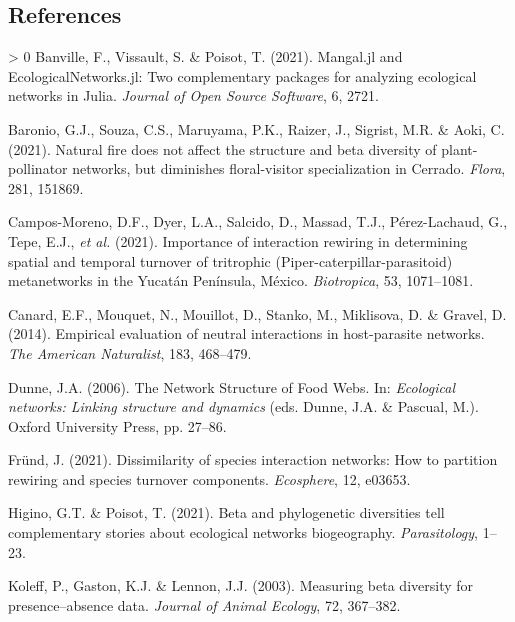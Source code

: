 \documentclass[11pt]{article}
\newlength{\cslhangindent}
\newenvironment{CSLReferences}[3] %
 {%
  \setlength{\parindent}{0pt}
  \ifodd #1 \everypar{\setlength{\hangindent}{\cslhangindent}}\ignorespaces\fi
  \ifnum #2 > 0
  \setlength{\parskip}{#2\baselineskip}
  \fi
 }%
 {}
\begin{document}
\hypertarget{references}{%
\subsection*{References}\label{references}}

\hypertarget{refs}{}
\begin{CSLReferences}{1}{0}
\leavevmode\hypertarget{ref-Banville2021ManJl}{}%
Banville, F., Vissault, S. \& Poisot, T. (2021). Mangal.jl and
EcologicalNetworks.jl: Two complementary packages for analyzing
ecological networks in Julia. \emph{Journal of Open Source Software}, 6,
2721.

\leavevmode\hypertarget{ref-Baronio2021NatFir}{}%
Baronio, G.J., Souza, C.S., Maruyama, P.K., Raizer, J., Sigrist, M.R. \&
Aoki, C. (2021). Natural fire does not affect the structure and beta
diversity of plant-pollinator networks, but diminishes floral-visitor
specialization in Cerrado. \emph{Flora}, 281, 151869.

\leavevmode\hypertarget{ref-Campos-Moreno2021ImpInt}{}%
Campos-Moreno, D.F., Dyer, L.A., Salcido, D., Massad, T.J.,
Pérez-Lachaud, G., Tepe, E.J., \emph{et al.} (2021). Importance of
interaction rewiring in determining spatial and temporal turnover of
tritrophic (Piper-caterpillar-parasitoid) metanetworks in the Yucatán
Península, México. \emph{Biotropica}, 53, 1071--1081.

\leavevmode\hypertarget{ref-Canard2014EmpEva}{}%
Canard, E.F., Mouquet, N., Mouillot, D., Stanko, M., Miklisova, D. \&
Gravel, D. (2014). Empirical evaluation of neutral interactions in
host-parasite networks. \emph{The American Naturalist}, 183, 468--479.

\leavevmode\hypertarget{ref-Dunne2006NetStr}{}%
Dunne, J.A. (2006). The Network Structure of Food Webs. In:
\emph{Ecological networks: Linking structure and dynamics} (eds. Dunne,
J.A. \& Pascual, M.). Oxford University Press, pp. 27--86.

\leavevmode\hypertarget{ref-Frund2021DisSpe}{}%
Fründ, J. (2021). Dissimilarity of species interaction networks: How to
partition rewiring and species turnover components. \emph{Ecosphere},
12, e03653.

\leavevmode\hypertarget{ref-Higino2021BetPhy}{}%
Higino, G.T. \& Poisot, T. (2021). Beta and phylogenetic diversities
tell complementary stories about ecological networks biogeography.
\emph{Parasitology}, 1--23.

\leavevmode\hypertarget{ref-Koleff2003MeaBet}{}%
Koleff, P., Gaston, K.J. \& Lennon, J.J. (2003). Measuring beta
diversity for presence--absence data. \emph{Journal of Animal Ecology},
72, 367--382.


\end{CSLReferences}
\end{document}
